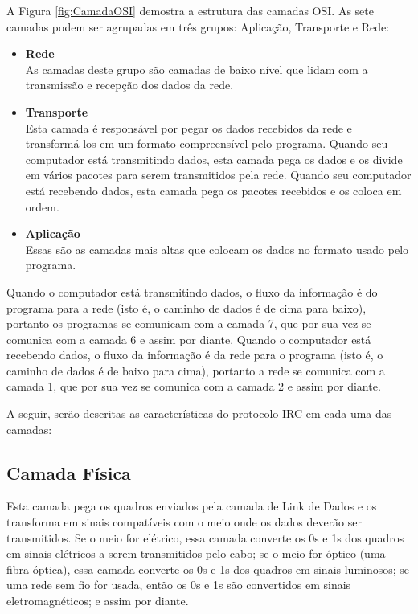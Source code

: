A Figura \ref{fig:CamadaOSI} demostra a estrutura das camadas OSI. As sete camadas podem ser agrupadas em três grupos: Aplicação, Transporte e Rede:

\begin{itemize}
 \item \textbf{{Rede}} \\
	As camadas deste grupo são camadas de baixo nível que lidam com a transmissão e recepção dos dados da rede.
 \item \textbf{{Transporte}} \\
	Esta camada é responsável por pegar os dados recebidos da rede e transformá-los em um formato compreensível pelo programa. Quando seu computador está transmitindo dados, esta camada pega os dados e os divide em vários pacotes para serem transmitidos pela rede. Quando seu computador está recebendo dados, esta camada pega os pacotes recebidos e os coloca em ordem.
 \item \textbf{{Aplicação}} \\
	Essas são as camadas mais altas que colocam os dados no formato usado pelo programa.
\end{itemize}

Quando o computador está transmitindo dados, o fluxo da informação é do programa para a rede (isto é, o caminho de dados é de cima para baixo), portanto os programas se comunicam com a camada 7, que por sua vez se comunica com a camada 6 e assim por diante. Quando o computador está recebendo dados, o fluxo da informação é da rede para o programa (isto é, o caminho de dados é de baixo para cima), portanto a rede se comunica com a camada 1, que por sua vez se comunica com a camada 2 e assim por diante.

A seguir, serão descritas as características do protocolo IRC em cada uma das camadas:

\subsection{Camada Física}

Esta camada pega os quadros enviados pela camada de Link de Dados e os transforma em sinais compatíveis com o meio onde os dados deverão ser transmitidos. Se o meio for elétrico, essa camada converte os 0s e 1s dos quadros em sinais elétricos a serem transmitidos pelo cabo; se o meio for óptico (uma fibra óptica), essa camada converte os 0s e 1s dos quadros em sinais luminosos; se uma rede sem fio for usada, então os 0s e 1s são convertidos em sinais eletromagnéticos; e assim por diante.

